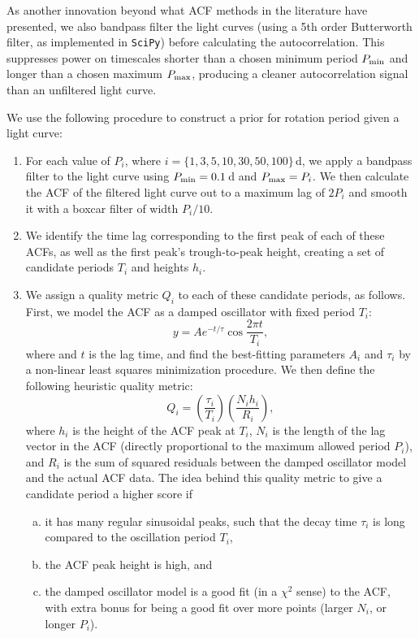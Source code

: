 \documentclass[useAMS, usenatbib, preprint, 12pt]{aastex}
\begin{document}
As another innovation beyond what ACF methods in the literature have
presented, we also bandpass filter the light curves (using a 5th order
Butterworth filter, as implemented in \texttt{SciPy}) before calculating the
autocorrelation.  This suppresses power on timescales shorter than a chosen
minimum period $P_{\rm min}$ and longer than a chosen maximum $P_{\rm max}$,
producing a cleaner autocorrelation signal than an unfiltered light curve.

We use the following procedure to construct a prior for rotation period
given a light curve:
\begin{enumerate}
\item{For each value of $P_i$, where $i = \{1, 3, 5, 10, 30, 50, 100\}$\,d,
we apply a bandpass filter to the light curve using $P_{\rm min}=0.1$\,d
and $P_{\rm max} = P_i$.  We then calculate the ACF of the filtered
light curve out to a maximum lag of $2P_i$ and smooth it with a boxcar
filter of width $P_i/10$.}

\item{We identify the time lag corresponding to the
first peak of each of these ACFs, as well as the first peak's
trough-to-peak height, creating a set of candidate periods
$T_i$ and heights $h_i$.}

\item{We assign a quality metric $Q_i$ to each of these candidate
periods, as follows.  First, we model the ACF as a
damped oscillator with fixed period $T_i$:
\begin{equation}
y = A e^{-t/\tau} \cos{\frac{2\pi t}{T_i} },
\end{equation}
where and $t$ is the lag time,
and find the best-fitting parameters $A_i$ and $\tau_i$ by a non-linear
least squares minimization procedure.  We then define the
following heuristic quality metric:
\begin{equation}
\label{eq:quality}
Q_i = \left(\frac{\tau_i}{T_i}\right) \left(\frac{N_i h_i}{R_i}\right),
\end{equation}
where $h_i$ is the height of the ACF peak at $T_i$,
$N_i$ is the length of the lag vector in the ACF (directly proportional
to the maximum allowed period $P_i$),
and $R_i$ is the sum of squared residuals between the
damped oscillator model and the actual ACF data.  The idea behind this
quality metric to give a candidate period a higher score if

    \begin{enumerate}[(a)]

    \item{it has many regular sinusoidal peaks, such that the decay
        time $\tau_i$ is long compared to the oscillation period $T_i$,}
    \item{the ACF peak height is high, and}
    \item{the damped oscillator model is a good fit (in a $\chi^2$
      sense) to the ACF, with extra bonus for being
      a good fit over more points (larger $N_i$, or longer $P_i$).}


\end{enumerate}}
\end{enumerate}
\end{document}
